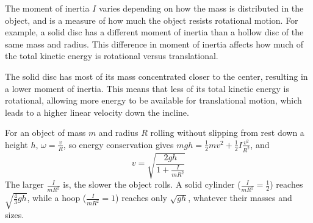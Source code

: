 The moment of inertia $I$ varies depending on how the mass is distributed in the object, and is a measure of how much the object resists rotational motion. For example, a solid disc has a different moment of inertia than a hollow disc of the same mass and radius. This difference in moment of inertia affects how much of the total kinetic energy is rotational versus translational.

The solid disc has most of its mass concentrated closer to the center, resulting in a lower moment of inertia. This means that less of its total kinetic energy is rotational, allowing more energy to be available for translational motion, which leads to a higher linear velocity down the incline.

\begin{mdframed}[frametitle = {Relationship between translational velocity and moment}, style = important]
For an object of mass $m$ and radius $R$ rolling without slipping from
rest down a height $h$, $\omega = \frac{v}{R}$, so energy conservation gives
$mgh = \frac{1}{2}mv^2 + \frac{1}{2}I\frac{v^2}{R^2}$, and
\begin{equation}
v = \sqrt{\frac{2gh}{1 + \frac{I}{mR^2}}}
\end{equation}
The larger $\frac{I}{mR^2}$ is, the slower the object rolls. A solid
cylinder ($\frac{I}{mR^2} = \frac{1}{2}$) reaches $\sqrt{\frac{4}{3}gh}$,
while a hoop ($\frac{I}{mR^2} = 1$) reaches only $\sqrt{gh}$, whatever
their masses and sizes.
\end{mdframed}

